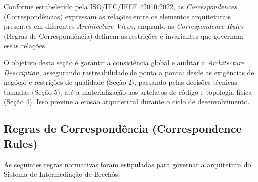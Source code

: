 \documentclass[12pt, a4paper]{article}
\begin{document}
Conforme estabelecido pela ISO/IEC/IEEE 42010:2022, as \textit{Correspondences} (Correspondências) expressam as relações entre os elementos arquiteturais presentes em diferentes \textit{Architecture Views}, enquanto as \textit{Correspondence Rules} (Regras de Correspondência) definem as restrições e invariantes que governam essas relações. 

O objetivo desta seção é garantir a consistência global e auditar a \textit{Architecture Description}, assegurando rastreabilidade de ponta a ponta: desde as exigências de negócio e restrições de qualidade (Seção 2), passando pelas decisões técnicas tomadas (Seção 5), até a materialização nos artefatos de código e topologia física (Seção 4). Isso previne a erosão arquitetural durante o ciclo de desenvolvimento.

\subsection{Regras de Correspondência (Correspondence Rules)}

As seguintes regras normativas foram estipuladas para governar a arquitetura do Sistema de Intermediação de Brechós.
\end{document}
